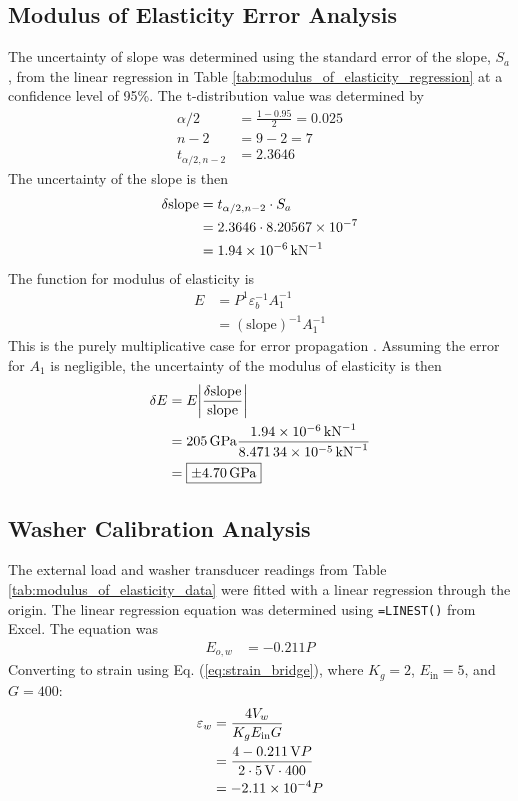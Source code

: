 \subsection{Modulus of Elasticity Error Analysis}
The uncertainty of slope was determined using the standard error of the slope, $S_a$, from the linear regression in Table \ref{tab:modulus_of_elasticity_regression} at a confidence level of 95\%. The t-distribution value was determined by 
\begin{align*}
    \alpha/2 &= \frac{1 - 0.95}{2} = 0.025 \\
    n - 2 &= 9 - 2 = 7 \\
    t_{\alpha/2, n-2} &= 2.3646
\end{align*}
The uncertainty of the slope is then \cite{wheeler_ganji}
\begin{align*}
    \delta \text{slope} &= t_{\alpha/2, n-2} \cdot S_a \\
    &= 2.3646 \cdot 8.20567 \times 10^{-7} \\
    &= \qty{1.94E-06}{\per\kilo\newton}
\end{align*}
The function for modulus of elasticity is 
\begin{align*}
    E &= P^{1} \varepsilon_b^{-1} A_1^{-1} \\
    &= (\text{slope})^{-1} A_1^{-1}
\end{align*}
This is the purely multiplicative case for error propagation \cite{wheeler_ganji}. Assuming the error for $A_1$ is negligible, the uncertainty of the modulus of elasticity is then
\begin{align*}
    \delta E &= E \bigg|\frac{\delta \text{slope}}{\text{slope}}\bigg|\\
    &= \qty{205}{\giga\pascal} \frac{\qty{1.94E-06}{\per\kilo\newton}}{\qty{8.47134E-05}{\per\kilo\newton}} \\
    &= \boxed{\pm \qty{4.70}{\giga\pascal}}
\end{align*}

\subsection{Washer Calibration Analysis}
The external load and washer transducer readings from Table \ref{tab:modulus_of_elasticity_data} were fitted with a linear regression through the origin. The linear regression equation was determined using \texttt{=LINEST()} from Excel. The equation was 
\begin{align*}
    E_{o, w} &= -0.211 P 
\end{align*}
Converting to strain using Eq. (\ref{eq:strain_bridge}), where $K_g = 2$, $E_{\text{in}} = 5$, and $G = 400$:
\begin{align*}
    \varepsilon_w &= \frac{4 V_{w}}{K_g E_{\text{in}} G} \\
    &= \frac{4 \qty{-0.211}{V}P}{2 \cdot \qty{5}{V} \cdot 400} \\
    &= \qty{-2.11E-04}{} P
\end{align*}


